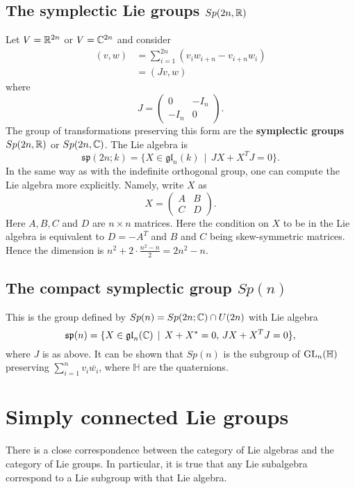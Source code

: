 \documentclass[11pt, english]{article}
\begin{document}
\subsection{The symplectic Lie groups $Sp(2n,\mathbb{R})$}

Let $V= \mathbb{R}^{2n}$ or $V= \mathbb{C}^{2n}$ and consider
\begin{align*}
  (v,w) &= \sum_{i=1}^{2n} (v_i w_{i+n}-v_{i+n}w_i) \\
&= (Jv,w)
\end{align*}
where
$$
J =
\begin{pmatrix}
  0 & -I_n \\
-I_n & 0 
\end{pmatrix}.
$$
The group of transformations preserving this form are the \textbf{symplectic groups} $Sp(2n,\mathbb{R})$ or $Sp(2n,\mathbb{C})$. The Lie algebra is
$$
\mathfrak{sp}(2n;k) = \{ X \in \mathfrak{gl}_n(k) \, \mid \, JX+X^TJ = 0 \}.
$$
In the same way as with the indefinite orthogonal group, one can compute the Lie algebra more explicitly. Namely, write $X$ as 
$$
X =
\begin{pmatrix}
  A & B \\
C & D
\end{pmatrix}.
$$
Here $A,B,C$ and $D$ are $n \times n$ matrices. Here the condition on $X$ to be in the Lie algebra is equivalent to $D=-A^T$ and $B$ and $C$ being skew-symmetric matrices. Hence the dimension is $n^2+2 \cdot \frac{n^2-n}{2} = 2n^2-n$.

\subsection{The compact symplectic group $Sp(n)$} 

This is the group defined by $Sp(n) = Sp(2n; \mathbb{C}) \cap U(2n)$ with Lie algebra
$$
\mathfrak{sp}(n) = \{ X \in \mathfrak{gl}_n(\mathbb{C}) \, \mid \, X+X^*=0, \, JX+X^TJ = 0\},
$$
where $J$ is as above. It can be shown that $Sp(n)$ is the subgroup of $\operatorname{GL}_n(\mathbb H)$ preserving $\sum_{i=1}^n v_i \overline{w_i}$, where $\mathbb H$ are the quaternions.


\newpage
\section{Simply connected Lie groups}

There is a close correspondence between the category of Lie algebras and the category of Lie groups. In particular, it is true that any Lie subalgebra correspond to a Lie subgroup with that Lie algebra.
\end{document}
